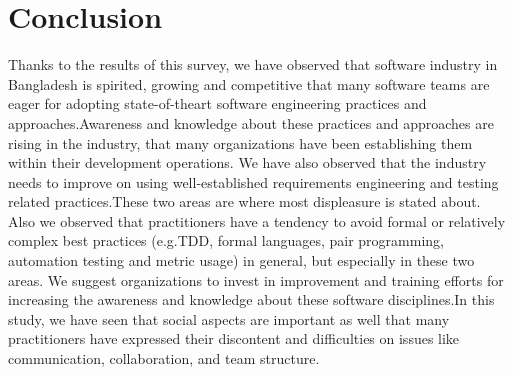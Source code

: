 \section{Conclusion}
\label{sec:conclusion}
Thanks to the results of this survey, we have observed that software industry in Bangladesh is
spirited, growing and competitive that many software teams are eager for adopting state-of-theart software engineering practices and approaches.Awareness and knowledge about these practices and approaches are rising in the industry, that many organizations have been establishing
them within their development operations. We have also observed that the industry needs to
improve on using well-established requirements engineering and testing related practices.These
two areas are where most displeasure is stated about. Also we observed that practitioners have
a tendency to avoid formal or relatively complex best practices (e.g.TDD, formal languages,
pair programming, automation testing and metric usage) in general, but especially in these two
areas. We suggest organizations to invest in improvement and training efforts for increasing
the awareness and knowledge about these software disciplines.In this study, we have seen that
social aspects are important as well that many practitioners have expressed their discontent and
difficulties on issues like communication, collaboration, and team structure.
